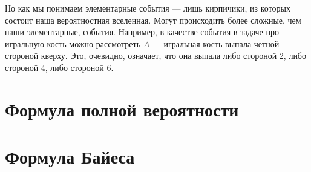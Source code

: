 Но как мы понимаем элементарные события --- лишь кирпичики, из которых состоит наша вероятностная вселенная. Могут происходить более сложные, чем наши элементарные, события. Например, в качестве события в задаче про игральную кость можно рассмотреть $A$ --- игральная кость выпала четной стороной кверху. Это, очевидно, означает, что она выпала либо стороной 2, либо стороной 4, либо стороной 6.
\section{Формула полной вероятности}
\section{Формула Байеса}